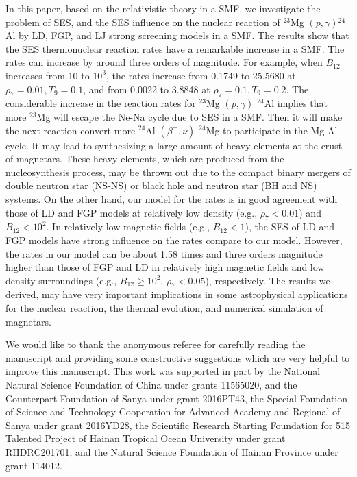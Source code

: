 \documentclass[manuscript]{aastex}
\begin{document}
In this paper, based on the relativistic theory in a SMF, we
investigate the problem of SES, and the SES influence on the nuclear
reaction of $^{23}$Mg $(p, \gamma)$$^{24}$Al by LD, FGP, and LJ
strong screening models in a SMF. The results show that the SES
thermonuclear reaction rates have a remarkable increase in a SMF.
The rates can increase by around three orders of magnitude. For
example, when $B_{12}$ increases from 10 to $10^3$, the rates
increase from 0.1749 to 25.5680 at $\rho_7=0.01, T_9=0.1$, and from
0.0022 to 3.8848 at $\rho_7=0.1, T_9=0.2$. The considerable increase
in the reaction rates for $^{23}$Mg $(p, \gamma)$ $^{24}$Al implies
that more $^{23}$Mg will escape the Ne-Na cycle due to SES in a SMF.
Then it will make the next reaction convert more $^{24}$Al
$(\beta^+, \nu)$ $^{24}$Mg to participate in the Mg-Al cycle. It may
lead to synthesizing a large amount of heavy elements at the crust
of magnetars. These heavy elements, which are produced from the
nucleosynthesis process, may be thrown out due to the compact binary
mergers of double neutron star (NS-NS) or black hole and neutron
star (BH and NS) systems. On the other hand, our model for the rates
is in good agreement with those of LD and FGP models at relatively
low density (e.g., $\rho_7<0.01$) and $B_{12}<10^2$. In relatively
low magnetic fields (e.g., $B_{12}<1$), the SES of LD and FGP models
have strong influence on the rates compare to our model. However,
the rates in our model can be about 1.58 times and three orders
magnitude higher than those of FGP and LD in relatively high
magnetic fields and low density surroundings (e.g.,
$B_{12}\geq10^2$, $\rho_7<0.05$), respectively. The results we
derived, may have very important implications in some astrophysical
applications for the nuclear reaction, the thermal evolution, and
numerical simulation of magnetars.

\acknowledgments

We would like to thank the anonymous referee for carefully reading
the manuscript and providing some constructive suggestions which are
very helpful to improve this manuscript. This work was supported in
part by the National Natural Science Foundation of China under
grants 11565020, and the Counterpart Foundation of Sanya under grant
2016PT43, the Special Foundation of Science and Technology
Cooperation for Advanced Academy and Regional of Sanya under grant
2016YD28, the Scientific Research Starting Foundation for 515
Talented Project of Hainan Tropical Ocean University under grant
RHDRC201701, and the Natural Science Foundation of Hainan Province
under grant 114012.
\end{document}
